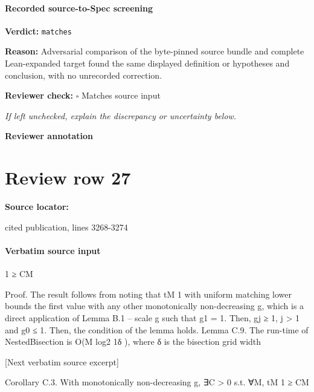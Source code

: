 \documentclass[10pt]{article}
\newcommand{\reviewerbox}{%
  \par\noindent\fbox{\parbox{0.96\linewidth}{\rule{0pt}{0.38in}}}\par
}
\newcommand{\reviewmatch}[1]{%
  \par\noindent\textbf{Reviewer check:} $\square$\; #1\par
  \noindent\emph{If left unchecked, explain the discrepancy or uncertainty below.}\par
}
\begin{document}
\paragraph{Recorded source-to-Spec screening}
\textbf{Verdict:} \texttt{matches}
\\
{\raggedright
\textbf{Reason:} Adversarial comparison of the byte-\allowbreak{}pinned source bundle and complete Lean-\allowbreak{}expanded target found the same displayed definition or hypotheses and conclusion, with no unrecorded correction.\allowbreak{}
\par}
\reviewmatch{Matches source input}
\noindent\textbf{Reviewer annotation}\par
\reviewerbox
\clearpage
\hypertarget{source-claim-d7f37d83d608e4fa}{}
\section*{Review row 27}
\textbf{Source locator:} {\footnotesize\raggedright cited publication, lines 3268-\allowbreak{}3274\par}
\paragraph{Verbatim source input}
\begin{ReviewVerbatim}
1 ≥ CM

Proof. The result follows from noting that tM
1 with uniform matching lower bounds the first value
with any other monotonically non-decreasing g, which is a direct application of Lemma B.1 – scale
g such that g1 = 1. Then, gj ≥ 1, j > 1 and g0 ≤ 1. Then, the condition of the lemma holds.
Lemma C.9. The run-time of NestedBisection is O(M log2 1δ ), where δ is the bisection grid width

[Next verbatim source excerpt]

Corollary C.3. With monotonically non-decreasing g, ∃C > 0 s.t. ∀M, tM
1 ≥ CM
\end{ReviewVerbatim}
\end{document}

